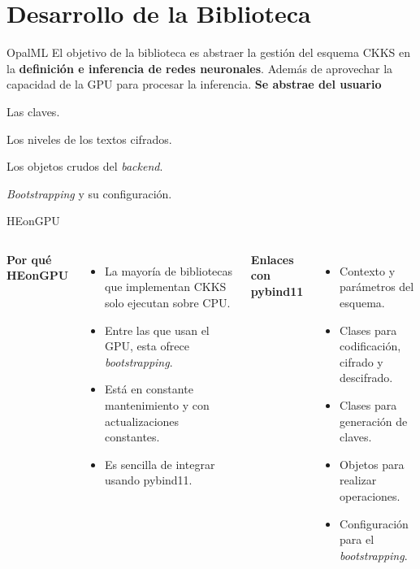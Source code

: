 \section{Desarrollo de la Biblioteca}

\begin{frame}{OpalML}
    El objetivo de la biblioteca es abstraer la gestión del esquema CKKS en la \textbf{definición e inferencia de redes neuronales}. Además de aprovechar la capacidad de la GPU para procesar la inferencia.
    \vfill
    \textbf{Se abstrae del usuario}
    \begin{listaalineada}
        \setlength{\itemsep}{10pt}
        \item Las claves.
        \item Los niveles de los textos cifrados.
        \item Los objetos crudos del \textit{backend}.
        \item \textit{Bootstrapping} y su configuración.
    \end{listaalineada}
    \vfill
\end{frame}

\begin{frame}{HEonGPU}
    \begin{columns}[t]
        \textbf{Por qué HEonGPU}
        \begin{itemize}
            \setlength{\itemsep}{8pt}
            \item La mayoría de bibliotecas que implementan CKKS solo ejecutan sobre CPU.
            \item Entre las que usan el GPU, esta ofrece \textit{bootstrapping}.
            \item Está en constante mantenimiento y con actualizaciones constantes.
            \item Es sencilla de integrar usando pybind11.
        \end{itemize}

        \textbf{Enlaces con pybind11}
        \begin{itemize}
            \setlength{\itemsep}{9pt}
            \item Contexto y parámetros del esquema.
            \item Clases para codificación, cifrado y descifrado.
            \item Clases para generación de claves.
            \item Objetos para realizar operaciones.
            \item Configuración para el \textit{bootstrapping}.
        \end{itemize}
    \end{columns}
\end{frame}

